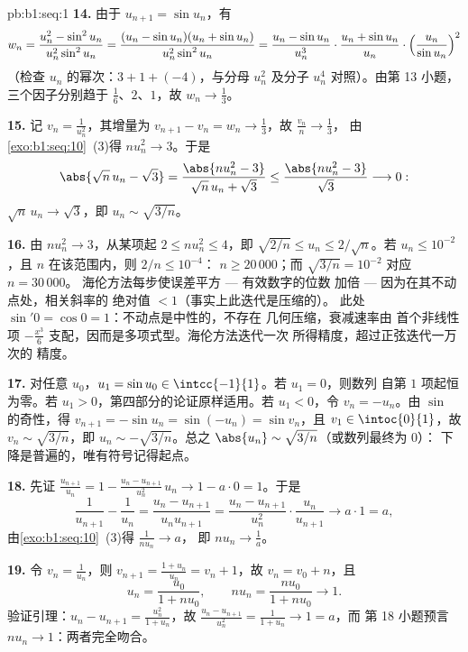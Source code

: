 \begin{solution}{pb:b1:seq:1}
\textbf{14.} 由于 $u_{n+1} = \sin u_n$，有
\[
w_n = \frac{u_n^2 - \sin^2 u_n}{u_n^2 \sin^2 u_n}
= \frac{(u_n - \sin u_n)(u_n + \sin u_n)}{u_n^2 \sin^2 u_n}
= \frac{u_n - \sin u_n}{u_n^3}\cdot
\frac{u_n + \sin u_n}{u_n}\cdot
\Bigl(\frac{u_n}{\sin u_n}\Bigr)^{2}
\]
（检查 $u_n$ 的幂次：$3 + 1 + (-4)$，与分母 $u_n^2$
及分子 $u_n^4$ 对照）。由第 13 小题，
三个因子分别趋于 $\frac16$、$2$、$1$，故 $w_n \to \frac13$。

\textbf{15.} 记 $v_n = \frac{1}{u_n^2}$，其增量为 $v_{n+1} -
v_n = w_n \to \frac13$，故 $\frac{v_n}{n} \to \frac13$，
由\cref{exo:b1:seq:10}~(3)得 $n u_n^2 \to 3$。于是
\[
\abs{\sqrt n\,u_n - \sqrt 3}
= \frac{\abs{n u_n^2 - 3}}{\sqrt n\,u_n + \sqrt 3}
\leq \frac{\abs{n u_n^2 - 3}}{\sqrt 3} \longrightarrow 0 :
\]
$\sqrt n\,u_n \to \sqrt 3$，即 $u_n \sim \sqrt{3/n}$。

\textbf{16.} 由 $n u_n^2 \to 3$，从某项起 $2 \leq n u_n^2
\leq 4$，即 $\sqrt{2/n} \leq u_n \leq 2/\sqrt n$。若 $u_n
\leq 10^{-2}$，且 $n$ 在该范围内，则 $2/n \leq 10^{-4}$：
$n \geq 20\,000$；而 $\sqrt{3/n} = 10^{-2}$ 对应 $n = 30\,000$。
海伦方法每步使误差平方 --- 有效数字的位数
加倍 --- 因为在其不动点处，相关斜率的
绝对值 $< 1$（事实上此迭代是压缩的）。
此处 $\sin' 0 = \cos 0 = 1$：不动点是中性的，不存在
几何压缩，衰减速率由
首个非线性项 $-\frac{x^3}{6}$ 支配，因而是多项式型。海伦方法迭代一次
所得精度，超过正弦迭代一万次的
精度。

\textbf{17.} 对任意 $u_0$，$u_1 = \sin u_0 \in
\intcc{-1}{1}$。若 $u_1 = 0$，则数列
自第 $1$ 项起恒为零。若 $u_1 > 0$，第四部分的论证原样适用。若 $u_1 < 0$，令
$v_n = -u_n$。由 $\sin$ 的奇性，得 $v_{n+1} = -\sin u_n =
\sin(-u_n) = \sin v_n$，且 $v_1 \in \intoc{0}{1}$，故 $v_n \sim
\sqrt{3/n}$，即 $u_n \sim -\sqrt{3/n}$。总之
$\abs{u_n} \sim \sqrt{3/n}$（或数列最终为 $0$）：
下降是普遍的，唯有符号记得起点。

\textbf{18.} 先证 $\frac{u_{n+1}}{u_n} = 1 - \frac{u_n -
u_{n+1}}{u_n^2}\,u_n \to 1 - a \cdot 0 = 1$。于是
\[
\frac{1}{u_{n+1}} - \frac{1}{u_n}
= \frac{u_n - u_{n+1}}{u_n u_{n+1}}
= \frac{u_n - u_{n+1}}{u_n^2}\cdot\frac{u_n}{u_{n+1}}
\longrightarrow a \cdot 1 = a ,
\]
由\cref{exo:b1:seq:10}~(3)得 $\frac{1}{n u_n} \to a$，
即 $n u_n \to \frac1a$。

\textbf{19.} 令 $v_n = \frac{1}{u_n}$，则 $v_{n+1} = \frac{1 +
u_n}{u_n} = v_n + 1$，故 $v_n = v_0 + n$，且
\[
u_n = \frac{u_0}{1 + n u_0} , \qquad
n u_n = \frac{n u_0}{1 + n u_0} \longrightarrow 1 .
\]
验证引理：$u_n - u_{n+1} = \frac{u_n^2}{1 + u_n}$，故
$\frac{u_n - u_{n+1}}{u_n^2} = \frac{1}{1 + u_n} \to 1 = a$，而
第 18 小题预言 $n u_n \to 1$：两者完全吻合。


\end{solution}
